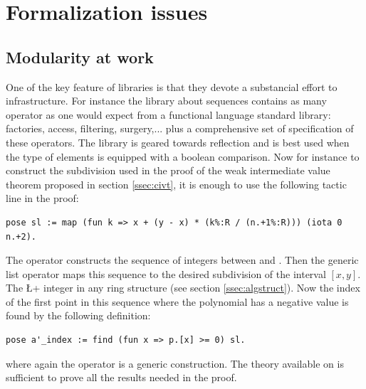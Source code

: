 \documentclass{mscs}
\begin{document}
\section{Formalization issues}
\label{sec:formal}

\subsection{Modularity at work}\label{ssec:modularity}

One of the key feature of \ssr{} libraries is that they devote a
substancial effort to infrastructure. For instance the library about
sequences contains as many operator as one would expect from a
functional language standard library: factories, access, filtering,
surgery,... plus a comprehensive set of specification of these
operators. The library is geared towards reflection and is best used
when the type of elements is equipped with a boolean comparison. Now
for instance to construct the subdivision used in the proof of the
weak intermediate value theorem proposed in section \ref{ssec:civt},
it is enough to use the following tactic line in the proof:
\begin{lstlisting}
pose sl := map (fun k => x + (y - x) * (k%:R / (n.+1%:R))) (iota 0 n.+2).
\end{lstlisting}
The  operator constructs the sequence of integers between
 and . Then the  generic list operator maps this
sequence to the desired subdivision of the interval $[x, y]$. The
\L+%
integer in any ring structure (see section \ref{ssec:algstruct}).
Now the index of the first point in this sequence where the polynomial has a
negative value is found by the following definition:
\begin{lstlisting}
pose a'_index := find (fun x => p.[x] >= 0) sl.
\end{lstlisting}
where again the  operator is a generic construction. The
theory available on  is sufficient to prove all the results
needed in the proof.
\end{document}
